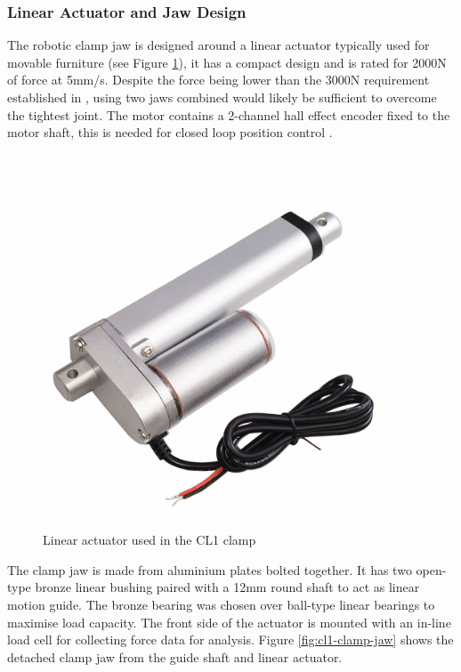 \subsubsection{Linear Actuator and Jaw Design}
\label{subsubsection:exploration-1-linear-actuator-and-jaw-design}

The robotic clamp jaw is designed around a linear actuator typically used for movable furniture (see Figure \ref{fig:linear-actuator-cl1}), it has a compact design and is rated for 2000N of force at 5mm/s. Despite the force being lower than the 3000N requirement established in , using two jaws combined would likely be sufficient to overcome the tightest joint. The motor contains a 2-channel hall effect encoder fixed to the motor shaft, this is needed for closed loop position control . 

\begin{figure}[hb!]
    \centering
    \includegraphics[width=0.99\textwidth]{images/04-3/cl1-linearactuator.jpg}
    \caption{Linear actuator used in the CL1 clamp}
    \label{fig:linear-actuator-cl1} 
\end{figure}

The clamp jaw is made from aluminium plates bolted together. It has two open-type bronze linear bushing paired with a 12mm round shaft to act as linear motion guide. The bronze bearing was chosen over ball-type linear bearings to maximise load capacity. The front side of the actuator is mounted with an in-line load cell for collecting force data for analysis. Figure \ref{fig:cl1-clamp-jaw} shows the detached clamp jaw from the guide shaft and linear actuator. 

